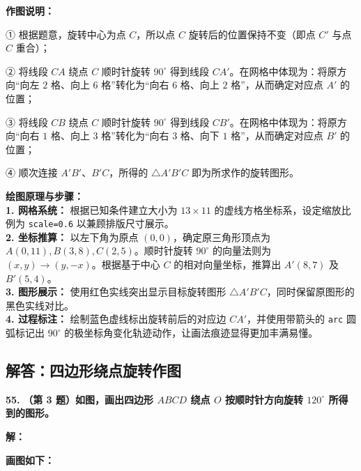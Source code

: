 \vspace{0.4cm}
\textbf{作图说明：}

① 根据题意，旋转中心为点 $C$，所以点 $C$ 旋转后的位置保持不变（即点 $C'$ 与点 $C$ 重合）；

② 将线段 $CA$ 绕点 $C$ 顺时针旋转 $90^\circ$ 得到线段 $CA'$。在网格中体现为：将原方向“向左 $2$ 格、向上 $6$ 格”转化为“向右 $6$ 格、向上 $2$ 格”，从而确定对应点 $A'$ 的位置；

③ 将线段 $CB$ 绕点 $C$ 顺时针旋转 $90^\circ$ 得到线段 $CB'$。在网格中体现为：将原方向“向右 $1$ 格、向上 $3$ 格”转化为“向右 $3$ 格、向下 $1$ 格”，从而确定对应点 $B'$ 的位置；

④ 顺次连接 $A'B'$、$B'C$，所得的 $\triangle A'B'C$ 即为所求作的旋转图形。

\vspace{0.4cm}
{\small\color{blue!70!black}
\textbf{绘图原理与步骤：}\\
\textbf{1. 网格系统：} 根据已知条件建立大小为 $13 \times 11$ 的虚线方格坐标系，设定缩放比例为 \texttt{scale=0.6} 以兼顾排版尺寸展示。\\
\textbf{2. 坐标推算：} 以左下角为原点 $(0,0)$，确定原三角形顶点为 $A(0,11), B(3,8), C(2,5)$。顺时针旋转 $90^\circ$ 的向量法则为 $(x, y) \to (y, -x)$。根据基于中心 $C$ 的相对向量坐标，推算出 $A'(8, 7)$ 及 $B'(5, 4)$。\\
\textbf{3. 图形展示：} 使用红色实线突出显示目标旋转图形 $\triangle A'B'C$，同时保留原图形的黑色实线对比。\\
\textbf{4. 过程标注：} 绘制蓝色虚线标出旋转前后的对应边 $CA'$，并使用带箭头的 \texttt{arc} 圆弧标记出 $90^\circ$ 的极坐标角变化轨迹动作，让画法痕迹显得更加丰满易懂。
}

\newpage

\newpage

\subsection{解答：四边形绕点旋转作图}

\vspace{0.6cm}

\textbf{\LARGE 55.} \textbf{（第 3 题）如图，画出四边形 $ABCD$ 绕点 $O$ 按顺时针方向旋转 $120^\circ$ 所得到的图形。}

\vspace{0.4cm}
\textbf{解：}

\textbf{画图如下：}


